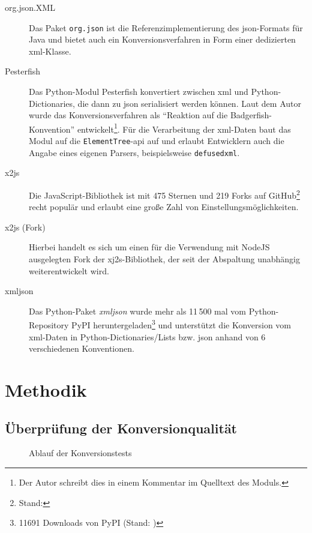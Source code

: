\begin{description}
    \item[org.json.XML] Das Paket \texttt{org.json} ist die Referenzimplementierung des \acrshort{json}-Formats für Java und bietet auch ein Konversionsverfahren in Form einer dedizierten \acrshort{xml}-Klasse.
    \item[Pesterfish] Das Python-Modul Pesterfish konvertiert zwischen \acrshort{xml} und Python-Dictionaries, die dann zu \acrshort{json} serialisiert werden können. Laut dem Autor wurde das Konversionsverfahren als \enquote{Reaktion auf die Badgerfish-Konvention} entwickelt\footnote{Der Autor schreibt dies in einem Kommentar im Quelltext des Moduls.}. Für die Verarbeitung der \acrshort{xml}-Daten baut das Modul auf die \texttt{ElementTree}-\acrshort{api} auf und erlaubt Entwicklern auch die Angabe eines eigenen Parsers, beispielsweise \texttt{defusedxml}.
    \item[x2js] Die JavaScript-Bibliothek ist mit 475 Sternen und 219 Forks auf GitHub\footnote{Stand: } recht populär und erlaubt eine große Zahl von Einstellungsmöglichkeiten.
    \item[x2js (Fork)] Hierbei handelt es sich um einen für die Verwendung mit NodeJS ausgelegten Fork der xj2s-Bibliothek, der seit der Abspaltung unabhängig weiterentwickelt wird.
    \item[xmljson] Das Python-Paket \emph{xmljson} wurde mehr als 11\,500 mal vom Python-Repository PyPI heruntergeladen\footnote{11691 Downloads von PyPI (Stand: )} und unterstützt die Konversion vom \acrshort{xml}-Daten in Python-Dictionaries/Lists bzw. \acrshort{json} anhand von 6 verschiedenen Konventionen.
\end{description}


\section{Methodik}
\label{sec:method}

\subsection{Überprüfung der Konversionqualität}
\label{sec:method-conv}

\begin{figure}[t]
    \begin{center}
        
        \caption{Ablauf der Konversionstests}
    \end{center}
\end{figure}

